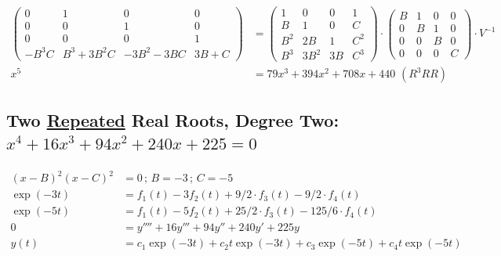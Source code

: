 \documentclass[12pt,a4paper]{article}
\begin{document}
\begin{align}
\left( \begin{matrix} 0 & 1 & 0 & 0 \\ 0 & 0 & 1 & 0 \\ 0 & 0 & 0 & 1 \\ -B^3C & B^3 + 3B^2C & -3B^2 - 3BC & 3B+C \end{matrix} \right)
&=
\left( \begin{matrix}  1 & 0 & 0 & 1 \\ B & 1 & 0 & C \\ B^2 & 2B & 1 & C^2 \\ B^3 & 3B^2 & 3B & C^3  \end{matrix} \right) \cdot
\left( \begin{matrix}  B & 1 & 0 & 0 \\ 0 & B & 1 & 0 \\ 0 & 0 & B & 0 \\ 0 & 0 & 0 & C  \end{matrix} \right) \cdot V^{-1} \nonumber \\
x^5 &= 79 x^3 + 394 x^2 + 708 x + 440\,\,(R^3RR)
\end{align}

\subsection{Two \href{}{Repeated} Real Roots, Degree Two: $x^4 + 16 x^3 + 94 x^2 + 240 x + 225 = 0$}

\begin{align}
(x - B)^2 (x - C)^2 &= 0\,;\,B = - 3\,;\,C = -5 \\
\exp (-3t) &= f_1(t) - 3 f_2(t) + 9/2\cdot f_3(t) - 9/2\cdot f_4(t) \\
\exp (-5t) &= f_1(t) - 5 f_2(t) + 25/2\cdot f_3(t) - 125/6\cdot f_4(t) \\
0 &= y'''' + 16 y''' + 94 y'' + 240 y' + 225 y \\
y(t) &= c_1 \exp(-3t) + c_2 t \exp(-3t) + c_3 \exp(-5t) + c_4 t \exp (-5t)
\end{align}
\end{document}
